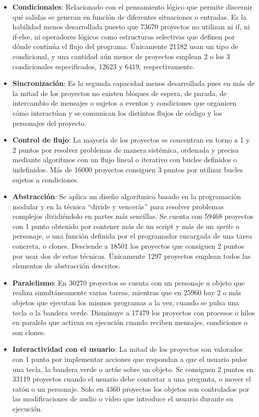 \documentclass[a4paper, 12pt]{book}
\begin{document}
\begin{itemize}    
    \item \textbf{Condicionales}: Relacionado con el pensamiento lógico que permite discernir qué salidas se generan en función de diferentes situaciones o entradas. Es la habilidad menos desarrollada puesto que 73670 proyectos no utilizan ni if, ni if-else, ni operadores lógicos como estructuras selectivas que definen por dónde continúa el flujo del programa. Únicamente 21182 usan un tipo de condicional, y una cantidad aún menor de proyectos emplean 2 o los 3 condicionales especificados, 12623 y 6419, respectivamente.    
    \item \textbf{Sincronización}: Es la segunda capacidad menos desarrollada pues en más de la mitad de los proyectos no existen bloques de espera, de parada, de intercambio de mensajes o sujetos a eventos y condiciones que organicen cómo interactúan y se comunican los distintos flujos de código y los personajes del proyecto. %
    \item \textbf{Control de flujo}: La mayoría de los proyectos se concentran en torno a 1 y 2 puntos por resolver problemas de manera sistémica, ordenada y precisa mediante algoritmos con un flujo lineal o iterativo con bucles definidos o indefinidos.
    Más de 16000 proyectos consiguen 3 puntos por utilizar bucles sujetos a condiciones.    
    \item \textbf{Abstracción}: Se aplica un diseño algorítmico basado en la programación modular y en la técnica ``divide y vencerás'' para resolver problemas complejos dividiéndolo en partes más sencillas. Se cuenta con 59468 proyectos con 1 punto obtenido por contener más de un script y más de un \emph{sprite} o personaje, o una función definida por el programador encargada de una tarea concreta, o clones. Desciende a 18501 los proyectos que consiguen 2 puntos por usar dos de estas técnicas. Únicamente 1297 proyectos emplean todos las elementos de abstracción descritos.    
    \item \textbf{Paralelismo}: En 30270 proyectos se cuenta con un personaje u objeto que realiza simultáneamente varias tareas, mientras que en 25960 hay 2 o más objetos que ejecutan los mismos programas a la vez, cuando se pulsa una tecla o la bandera verde.
    Disminuye a 17479 los proyectos con procesos o hilos en paralelo que activan su ejecución cuando reciben mensajes, condiciones o son clones.    
    \item \textbf{Interactividad con el usuario}: La mitad de los proyectos son valorados con 1 punto por implementar acciones que respondan a que el usuario pulse una tecla, la bandera verde o actúe sobre un objeto. Se consiguen 2 puntos en 33119 proyectos cuando el usuario debe contestar a una pregunta, o mover el ratón o un personaje. Solo en 4360 proyectos los objetos son controlados por las modificaciones de audio o vídeo que introduce el usuario durante su ejecución.    

\end{itemize}
\end{document}
